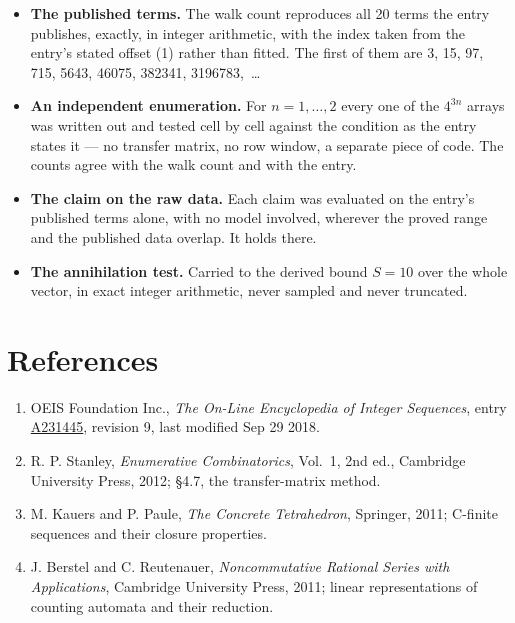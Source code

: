 \documentclass[11pt]{article}
\theoremstyle{definition}
\begin{document}
\begin{itemize}

\item {\bfseries The published terms.} The walk count reproduces all 20 terms the entry publishes, exactly, in integer arithmetic, with the index taken from the entry's stated offset (1) rather than fitted. The first of them are 3, 15, 97, 715, 5643, 46075, 382341, 3196783,~\dots

\item {\bfseries An independent enumeration.} For $n = 1,\dots,2$ every one of the $4^{3n}$ arrays was written out and tested cell by cell against the condition as the entry states it --- no transfer matrix, no row window, a separate piece of code. The counts agree with the walk count and with the entry.

\item {\bfseries The claim on the raw data.} Each claim was evaluated on the entry's published terms alone, with no model involved, wherever the proved range and the published data overlap. It holds there.

\item {\bfseries The annihilation test.} Carried to the derived bound $S = 10$ over the whole vector, in exact integer arithmetic, never sampled and never truncated.

\end{itemize}

\section{References}

\begin{enumerate}

\item OEIS Foundation Inc., \emph{The On-Line Encyclopedia of Integer Sequences}, entry \href{https://oeis.org/A231445}{A231445}, revision 9, last modified Sep 29 2018.

\item R. P. Stanley, \emph{Enumerative Combinatorics}, Vol.~1, 2nd ed., Cambridge University Press, 2012; \S4.7, the transfer-matrix method.

\item M. Kauers and P. Paule, \emph{The Concrete Tetrahedron}, Springer, 2011; C-finite sequences and their closure properties.

\item J. Berstel and C. Reutenauer, \emph{Noncommutative Rational Series with Applications}, Cambridge University Press, 2011; linear representations of counting automata and their reduction.

\end{enumerate}
\end{document}
